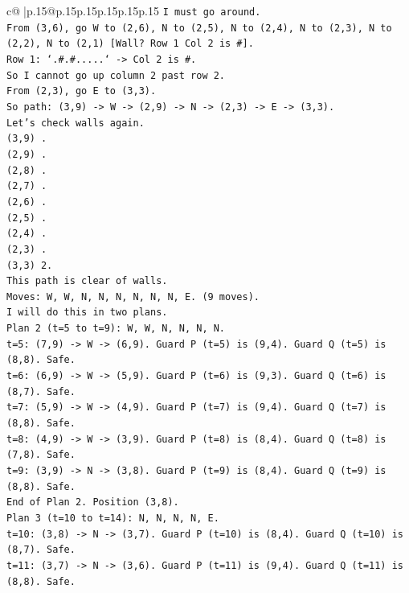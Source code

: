 \documentclass{article}
\begin{document}
{\begin{supertabular}{c@{$\;$}|p{.15\linewidth}@{}p{.15\linewidth}p{.15\linewidth}p{.15\linewidth}p{.15\linewidth}p{.15\linewidth}}
{{{\texttt{I must go around.} \\
\texttt{From (3,6), go W to (2,6), N to (2,5), N to (2,4), N to (2,3), N to (2,2), N to (2,1) {[}Wall? Row 1 Col 2 is \#{]}.} \\
\texttt{Row 1: `.\#.\#.....` {-}> Col 2 is \#.} \\
\texttt{So I cannot go up column 2 past row 2.} \\
\texttt{From (2,3), go E to (3,3).} \\
\texttt{So path: (3,9) {-}> W {-}> (2,9) {-}> N {-}> (2,3) {-}> E {-}> (3,3).} \\
\texttt{Let's check walls again.} \\
\texttt{(3,9) .} \\
\texttt{(2,9) .} \\
\texttt{(2,8) .} \\
\texttt{(2,7) .} \\
\texttt{(2,6) .} \\
\texttt{(2,5) .} \\
\texttt{(2,4) .} \\
\texttt{(2,3) .} \\
\texttt{(3,3) 2.} \\
\texttt{This path is clear of walls.} \\
\texttt{Moves: W, W, N, N, N, N, N, N, E. (9 moves).} \\
\texttt{I will do this in two plans.} \\
\texttt{Plan 2 (t=5 to t=9): W, W, N, N, N, N.} \\
\texttt{t=5: (7,9) {-}> W {-}> (6,9). Guard P (t=5) is (9,4). Guard Q (t=5) is (8,8). Safe.} \\
\texttt{t=6: (6,9) {-}> W {-}> (5,9). Guard P (t=6) is (9,3). Guard Q (t=6) is (8,7). Safe.} \\
\texttt{t=7: (5,9) {-}> W {-}> (4,9). Guard P (t=7) is (9,4). Guard Q (t=7) is (8,8). Safe.} \\
\texttt{t=8: (4,9) {-}> W {-}> (3,9). Guard P (t=8) is (8,4). Guard Q (t=8) is (7,8). Safe.} \\
\texttt{t=9: (3,9) {-}> N {-}> (3,8). Guard P (t=9) is (8,4). Guard Q (t=9) is (8,8). Safe.} \\
\texttt{End of Plan 2. Position (3,8).} \\
\texttt{Plan 3 (t=10 to t=14): N, N, N, N, E.} \\
\texttt{t=10: (3,8) {-}> N {-}> (3,7). Guard P (t=10) is (8,4). Guard Q (t=10) is (8,7). Safe.} \\
\texttt{t=11: (3,7) {-}> N {-}> (3,6). Guard P (t=11) is (9,4). Guard Q (t=11) is (8,8). Safe.} \\
}}}
\end{supertabular}}
\end{document}
